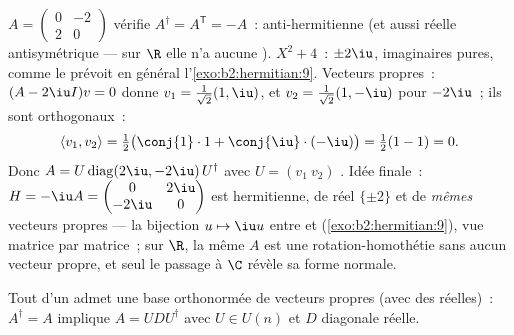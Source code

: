 \begin{example}\label{ex:b2:hermitian:skewexample}
$A = \begin{pmatrix} 0 & -2\\ 2 & 0\end{pmatrix}$ vérifie
$A^\dagger = A^{\mathsf T} = -A$~: anti-hermitienne (et aussi réelle
antisymétrique --- sur $\R$ elle n'a aucune ).
 $X^2 + 4$~:  $\pm2\iu$,
imaginaires pures, comme le prévoit en général
l'\cref{exo:b2:hermitian:9}. Vecteurs propres~: $(A - 2\iu I)v = 0$
donne $v_1 = \frac{1}{\sqrt2}(1, \iu)$, et $v_2 = \frac{1}{\sqrt2}(1,
-\iu)$ pour $-2\iu$~; ils sont orthogonaux~:
\[
\langle v_1, v_2\rangle
= \tfrac12\bigl(\conj{1}\cdot1 +
\conj{\iu}\cdot(-\iu)\bigr)
= \tfrac12(1 - 1) = 0 .
\]
Donc $A = U\operatorname{diag}(2\iu, -2\iu)\,U^\dagger$ avec $U =
(v_1\ v_2)$ . Idée finale~: $H = -\iu A =
\begin{pmatrix} 0 & 2\iu\\ -2\iu & 0\end{pmatrix}$ est hermitienne,
de  réel $\{\pm2\}$ et de \emph{mêmes} vecteurs propres --- la
bijection $u \mapsto \iu u$ entre  et
 (\cref{exo:b2:hermitian:9}), vue matrice par
matrice~; sur $\R$, la même $A$ est une rotation-homothétie sans
aucun vecteur propre, et seul le passage à $\C$ révèle sa forme
normale.
\end{example}

\begin{theorem}\label{thm:b2:hermitian:spectral}
Tout  d'un  admet une base
orthonormée de vecteurs propres (avec des  réelles)~:
$A^\dagger = A$ implique $A = U D U^{\dagger}$ avec $U \in U(n)$ et $D$
diagonale réelle.
\end{theorem}

